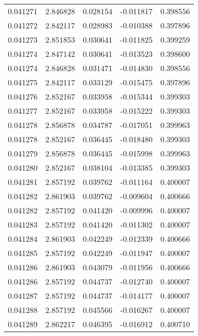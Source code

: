 \begin{tabular}{lrrrr}
0.041271    &  2.846828 &  0.028154 & -0.011817 &             0.398556 \\
0.041272    &  2.842117 &  0.028983 & -0.010388 &             0.397896 \\
0.041273    &  2.851853 &  0.030641 & -0.011825 &             0.399259 \\
0.041274    &  2.847142 &  0.030641 & -0.013523 &             0.398600 \\
0.041274    &  2.846828 &  0.031471 & -0.014830 &             0.398556 \\
0.041275    &  2.842117 &  0.033129 & -0.015475 &             0.397896 \\
0.041276    &  2.852167 &  0.033958 & -0.015344 &             0.399303 \\
0.041277    &  2.852167 &  0.033958 & -0.015222 &             0.399303 \\
0.041278    &  2.856878 &  0.034787 & -0.017051 &             0.399963 \\
0.041278    &  2.852167 &  0.036445 & -0.018480 &             0.399303 \\
0.041279    &  2.856878 &  0.036445 & -0.015998 &             0.399963 \\
0.041280    &  2.852167 &  0.038104 & -0.013385 &             0.399303 \\
0.041281    &  2.857192 &  0.039762 & -0.011164 &             0.400007 \\
0.041282    &  2.861903 &  0.039762 & -0.009604 &             0.400666 \\
0.041282    &  2.857192 &  0.041420 & -0.009996 &             0.400007 \\
0.041283    &  2.857192 &  0.041420 & -0.011302 &             0.400007 \\
0.041284    &  2.861903 &  0.042249 & -0.012339 &             0.400666 \\
0.041285    &  2.857192 &  0.042249 & -0.011947 &             0.400007 \\
0.041286    &  2.861903 &  0.043079 & -0.011956 &             0.400666 \\
0.041286    &  2.857192 &  0.044737 & -0.012740 &             0.400007 \\
0.041287    &  2.857192 &  0.044737 & -0.014177 &             0.400007 \\
0.041288    &  2.857192 &  0.045566 & -0.016267 &             0.400007 \\
0.041289    &  2.862217 &  0.046395 & -0.016912 &             0.400710 \\

\end{tabular}
